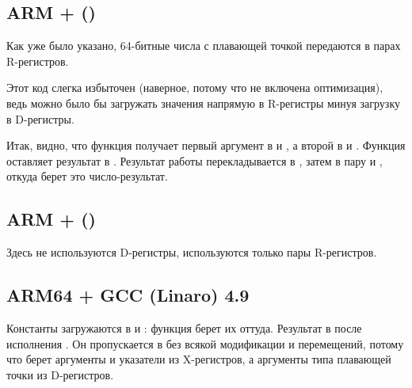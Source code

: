 \subsection{ARM + \NonOptimizingXcodeIV (\ThumbTwoMode)}
\label{FPU_passing_floats_ARM}



Как уже было указано, 64-битные числа с плавающей точкой передаются в парах R-регистров.

Этот код слегка избыточен (наверное, потому что не включена оптимизация), ведь можно было бы 
загружать значения напрямую в R-регистры минуя загрузку в D-регистры.

Итак, видно, что функция  получает первый аргумент в  и , а второй в  и . 
Функция оставляет результат в  \AndENRU {}.
Результат работы  перекладывается в , 
затем в пару  и , откуда 
\printf берет это число-результат.

\subsection{ARM + \NonOptimizingKeilVI (\ARMMode)}



Здесь не используются D-регистры, используются только пары R-регистров.

\subsection{ARM64 + \Optimizing GCC (Linaro) 4.9}



Константы загружаются в  и : 
функция  берет их оттуда.
Результат в  после исполнения .
Он пропускается в \printf без всякой модификации и перемещений, 
потому что \printf берет аргументы  и указатели 
из X-регистров, а аргументы типа плавающей точки из D-регистров.

